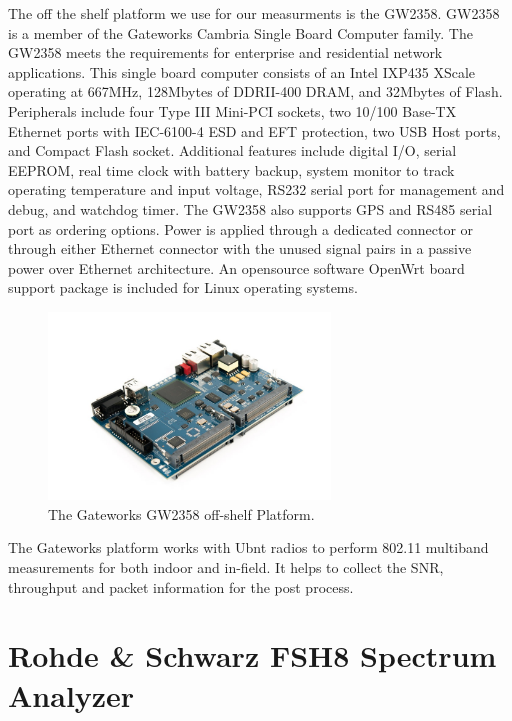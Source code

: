 The off the shelf platform we use for our measurments is the GW2358. 
GW2358 is a member of the Gateworks Cambria Single Board Computer family. 
The GW2358 meets the requirements for enterprise and residential network 
applications. This single board computer consists of an Intel IXP435 XScale 
operating at 667MHz, 128Mbytes of DDRII-400 DRAM, and 32Mbytes of Flash. 
Peripherals include four Type III Mini-PCI sockets, two 10/100 Base-TX 
Ethernet ports with IEC-6100-4 ESD and EFT protection, two USB Host ports, 
and Compact Flash socket. Additional features include digital I/O, serial 
EEPROM, real time clock with battery backup, system monitor to track 
operating temperature and input voltage, RS232 serial port for management 
and debug, and watchdog timer. The GW2358 also supports GPS and RS485 
serial port as ordering options. Power is applied through a dedicated 
connector or through either Ethernet connector with the unused signal 
pairs in a passive power over Ethernet architecture. 
An opensource software OpenWrt board support package is included 
for Linux operating systems.


\begin{figure} 
\centering
\includegraphics[width=75mm]{figures/gw2358}
\vspace{-0.1in}
\caption{The Gateworks GW2358 off-shelf Platform.}
\label{fig:gw2358}
\vspace{0.1in}
\end{figure}



The Gateworks platform works with Ubnt radios to perform 802.11 
multiband measurements for both indoor and in-field. It helps to 
collect the SNR, throughput and packet information for the post 
process. 

\section{Rohde \& Schwarz FSH8 Spectrum Analyzer}

